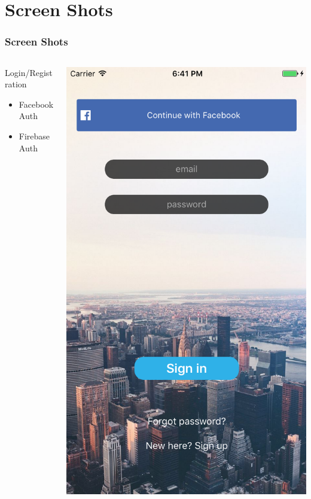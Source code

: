 \documentclass{beamer}
\begin{document}
\section{Screen Shots}
\begin{frame}
\frametitle{Screen Shots}
\begin{columns}
    \begin{column}{0.3\textwidth}
        Login/Registration
        \begin{itemize}
            \item Facebook Auth
            \item Firebase Auth
        \end{itemize}
    \end{column}
    \begin{column}{0.3\textwidth}  %
        \begin{center}
            \includegraphics[scale=0.3]{login}

\end{center}
\end{column}
\end{columns}
\end{frame}
\end{document}
